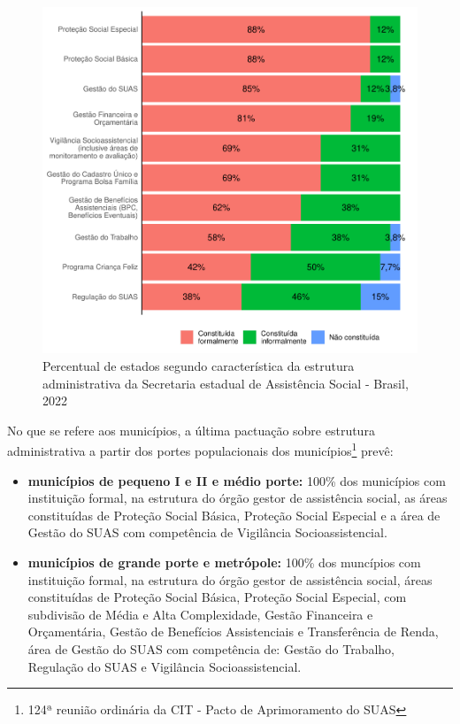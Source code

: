 \documentclass[
  brazilian]{report}
\begin{document}
\begin{figure}
\includegraphics{Censo-SUAS-2022_files/figure-latex/estados-constituicao-subdivisoes-1} \caption[Percentual de estados segundo característica da estrutura administrativa da Secretaria estadual de Assistência Social - Brasil,  2022]{Percentual de estados segundo característica da estrutura administrativa da Secretaria estadual de Assistência Social - Brasil,  2022}\label{fig:estados-constituicao-subdivisoes}
\end{figure}

No que se refere aos municípios, a última pactuação sobre estrutura
administrativa a partir dos portes populacionais dos
municípios\footnote{124ª reunião ordinária da CIT - Pacto de Aprimoramento do SUAS}
prevê:

\begin{itemize}
\item
  \textbf{municípios de pequeno I e II e médio porte:} 100\% dos
  municípios com instituição formal, na estrutura do órgão gestor de
  assistência social, as áreas constituídas de Proteção Social Básica,
  Proteção Social Especial e a área de Gestão do SUAS com competência de
  Vigilância Socioassistencial.
\item
  \textbf{municípios de grande porte e metrópole:} 100\% dos muncípios
  com instituição formal, na estrutura do órgão gestor de assistência
  social, áreas constituídas de Proteção Social Básica, Proteção Social
  Especial, com subdivisão de Média e Alta Complexidade, Gestão
  Financeira e Orçamentária, Gestão de Benefícios Assistenciais e
  Transferência de Renda, área de Gestão do SUAS com competência de:
  Gestão do Trabalho, Regulação do SUAS e Vigilância Socioassistencial.
\end{itemize}
\end{document}
